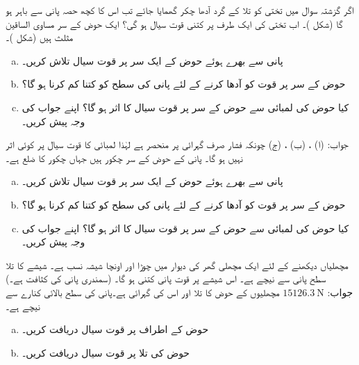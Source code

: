 اگر گزشتہ سوال میں تختی کو تلا کے گرد آدھا چکر گھمایا جائے تب اس کا کچھ حصہ پانی سے باہر ہو گا (شکل )۔ اب تختی کی ایک طرف پر کتنی قوت سیال ہو گی؟ 
ایک حوض کے  سر مساوی الساقین مثلث ہیں (شکل )۔
\begin{enumerate}[a.]
\item
 پانی سے بھرے ہوئے حوض کے ایک سر پر قوت سیال تلاش کریں۔
\item
حوض کے سر پر قوت کو آدھا کرنے کے لئے پانی کی سطح کو کتنا کم کرنا ہو گا؟
\item
کیا حوض کی لمبائی سے حوض کے سر پر قوت سیال کا اثر ہو گا؟ اپنے جواب کی وجہ پیش کریں۔
\end{enumerate}
جواب:\quad
(ا) ، (ب) ، (ج) چونکہ فشار صرف گہرائی پر منحصر ہے لہٰذا لمبائی کا قوت سیال پر کوئی اثر نہیں ہو گا۔
پانی کے حوض کے سر چکور ہیں جہاں چکور کا ضلع  ہے۔ 
\begin{enumerate}[a.]
\item
 پانی سے بھرے ہوئے حوض کے ایک سر پر قوت سیال تلاش کریں۔
\item
حوض کے سر پر قوت کو آدھا کرنے کے لئے پانی کی سطح کو کتنا کم کرنا ہو گا؟
\item
کیا حوض کی لمبائی سے حوض کے سر پر قوت سیال کا اثر ہو گا؟ اپنے جواب کی وجہ پیش کریں۔
\end{enumerate}
مچھلیاں دیکھنے کے لئے ایک مچھلی گھر کی دیوار میں  چوڑا اور  اونچا شیشہ نسب ہے۔ شیشے کا تلا   سطح پانی سے  نیچے ہے۔ اس شیشے پر قوت پانی کتنی ہو گا۔ (سمندری پانی کی کثافت  ہے۔)\\
جواب:\quad
$\SI{15126.3}{\newton}$
مچھلیوں کے حوض کا تلا  اور اس کی گہرائی  ہے۔پانی کی سطح بالائی کنارے سے  نیچے ہے۔
\begin{enumerate}[a.]
\item
حوض کے اطراف پر قوت سیال دریافت کریں۔
\item
حوض کی تلا پر قوت سیال دریافت کریں۔
\end{enumerate}
